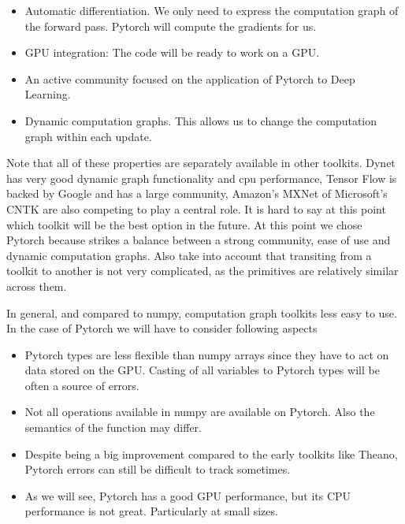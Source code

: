 \begin{itemize}
\item Automatic differentiation. We only need to express the computation graph of the forward pass. Pytorch will compute the gradients for us. 
\item GPU integration: The code will be ready to work on a GPU.
\item An active community focused on the application of Pytorch to Deep Learning.
\item Dynamic computation graphs. This allows us to change the computation graph within each update. 
\end{itemize}

Note that all of these properties are separately available in other toolkits. Dynet
has very good dynamic graph functionality and cpu performance, Tensor Flow is
backed by Google and has a large community, Amazon's MXNet of Microsoft's CNTK
are also competing to play a central role. It is hard to say at this point
which toolkit will be the best option in the future. At this point we chose Pytorch 
because strikes a balance between a strong community, ease of use and
dynamic computation graphs. Also take into account that transiting from a
toolkit to another is not very complicated, as the primitives are relatively
similar across them.

In general, and compared to numpy, computation graph toolkits less easy to use.
In the case of Pytorch we will have to consider following aspects 

\begin{itemize}
\item Pytorch types are less flexible than numpy arrays since they have to act on data stored on the GPU. Casting of all variables to Pytorch types will be often a source of errors.
\item Not all operations available in numpy are available on Pytorch. Also the semantics of the function may differ.
\item Despite being a big improvement compared to the early toolkits like Theano, Pytorch errors can still be difficult to track sometimes.
\item As we will see, Pytorch has a good GPU performance, but its CPU performance is not great. Particularly at small sizes. 
\end{itemize}



